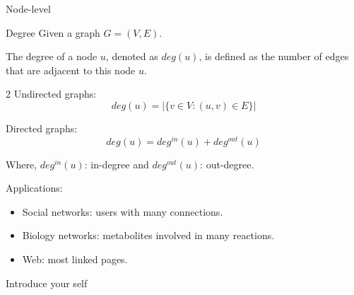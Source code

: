     \begin{frame}{Node-level}
        \begin{exampleblock}{Degree}
            Given a graph $G = (V, E)$.
            

            The degree of a node $u$, denoted as $deg(u)$, is defined as the number of edges that are adjacent to this node $u$.
        \end{exampleblock}

        \begin{multicols}{2} %
            Undirected graphs:
            \begin{equation}
                deg(u) = |\{v \in V : (u, v) \in E\}|
            \end{equation}
        
            Directed graphs:
            \begin{equation}
                deg(u) = deg^{in}(u) + deg^{out}(u)
            \end{equation}
        \end{multicols}
        
        Where, $deg^{in}(u)$: in-degree and $deg^{out}(u)$: out-degree. \newline

        Applications:
        \begin{itemize}
            \item Social networks: users with many connections.
            \item Biology networks: metabolites involved in many reactions.
            \item Web: most linked pages.
        \end{itemize}

        \begin{note}
            {Introduce your self}
        \end{note}
    \end{frame}

